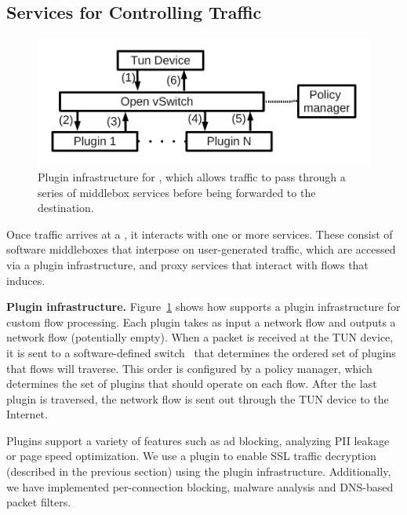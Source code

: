 \subsection{Services for Controlling Traffic}
\label{subsec:design_control}
\begin{figure}
\begin{center}
\includegraphics[width=\columnwidth]{figures/packet-monitoring-plugin.pdf}
\end{center}
\caption{Plugin infrastructure for \platname, which allows traffic to pass through 
a series of middlebox services before being forwarded to the destination. }
\label{fig:packet-monitoring-solution}
\end{figure}

Once traffic arrives at a \meddlebox, it interacts with one or more 
services. These consist of software middleboxes that interpose on 
user-generated traffic, which are accessed 
via a plugin infrastructure, and proxy services that interact with 
flows that \meddle induces.  

\noindent\textbf{Plugin infrastructure.} Figure~\ref{fig:packet-monitoring-solution} shows how 
\platname{} supports a plugin
infrastructure for custom flow processing. Each plugin takes as input a 
network flow and outputs a network flow (potentially empty). 
When a packet is received at the TUN
device, it is sent to a software-defined switch~\cite{Openvswitch} that 
determines the ordered set of plugins that flows will traverse. 
This order is configured by a policy manager, which determines 
the set of plugins that should operate on each flow. After the last 
plugin is traversed, the network flow is sent out through the TUN device 
to the Internet. 

Plugins support a variety of features such as ad blocking, 
analyzing PII leakage or page speed optimization. We 
 use a plugin to enable SSL traffic decryption (described in the previous section) using 
the \platname{} plugin infrastructure. Additionally, we have implemented 
per-connection blocking, malware analysis and DNS-based packet filters. 

